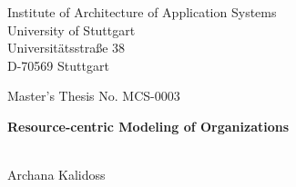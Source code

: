 \documentclass[
               fontsize=12pt, %
               paper=a4,
               twoside, %
               BCOR=3mm, %
               DIV=13,   %
               headinclude=true,
               footinclude=false,
               bibliography=totoc,
               headsepline,
               cleardoublepage=empty,
               parskip=half,
               pointlessnumbers, %
               final   %
               ]{scrbook}
\begin{document}
\pagestyle{plain}
\begin{titlepage}
	\begin{sffamily}
		\begin{center}
			Institute of Architecture of Application Systems\\
			University of Stuttgart\\
			Universitätsstraße 38\\
			D-70569 Stuttgart\\
		\end{center}
		
		\vspace{3.5cm}
		
		\begin{center}
			{Master's Thesis No. MCS-0003 }\\
			\vspace{0.5cm}
			\begin{minipage}{8.5cm}
				\begin{center}
					
					\Large \textbf{Resource-centric Modeling of Organizations}
					
				\end{center}
			\end{minipage}
			\\
			\vspace{1cm}
			{Archana Kalidoss}
		\end{center}
		
		\vspace{1.0cm}
		

\end{sffamily}
\end{titlepage}
\end{document}
